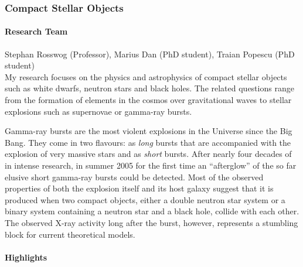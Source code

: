 \subsubsection{Compact Stellar Objects}
\label{GeoAstro:Rosswog}

\paragraph{Research Team}
Stephan Rosswog (Professor), Marius Dan (PhD student),
Traian Popescu (PhD student)\\



My research focuses on the physics and astrophysics of compact
stellar objects such as white dwarfs, neutron stars and black holes.
The related questions range from the formation of elements in the cosmos
over gravitational waves to stellar explosions such as supernovae or
gamma-ray bursts.

Gamma-ray bursts are the most violent explosions in the Universe
since the Big Bang. They come in two flavours: as {\em long}
bursts that are accompanied with the explosion of very massive
stars and as {\em short} bursts. After nearly four decades of
in intense research, in summer 2005 for the first time an
``afterglow'' of the so far elusive short gamma-ray bursts
could be detected. Most of the observed properties of both the explosion
itself and its host galaxy suggest that it is produced
when two compact objects, either a double neutron star
system or a binary system containing a neutron star and a black
hole, collide with each other. The observed X-ray activity long after the
burst, however, represents a stumbling block for current theoretical models.

\paragraph{Highlights}


